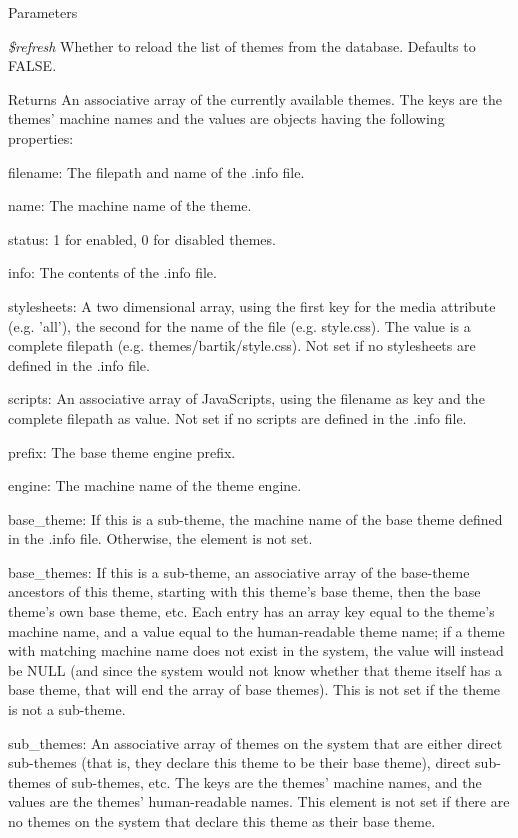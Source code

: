 \begin{DoxyParams}{Parameters}
\item[{\em \$refresh}]Whether to reload the list of themes from the database. Defaults to FALSE.\end{DoxyParams}
\begin{DoxyReturn}{Returns}
An associative array of the currently available themes. The keys are the themes' machine names and the values are objects having the following properties:
\begin{DoxyItemize}
\item filename: The filepath and name of the .info file.
\item name: The machine name of the theme.
\item status: 1 for enabled, 0 for disabled themes.
\item info: The contents of the .info file.
\item stylesheets: A two dimensional array, using the first key for the media attribute (e.g. 'all'), the second for the name of the file (e.g. style.css). The value is a complete filepath (e.g. themes/bartik/style.css). Not set if no stylesheets are defined in the .info file.
\item scripts: An associative array of JavaScripts, using the filename as key and the complete filepath as value. Not set if no scripts are defined in the .info file.
\item prefix: The base theme engine prefix.
\item engine: The machine name of the theme engine.
\item base\_\-theme: If this is a sub-\/theme, the machine name of the base theme defined in the .info file. Otherwise, the element is not set.
\item base\_\-themes: If this is a sub-\/theme, an associative array of the base-\/theme ancestors of this theme, starting with this theme's base theme, then the base theme's own base theme, etc. Each entry has an array key equal to the theme's machine name, and a value equal to the human-\/readable theme name; if a theme with matching machine name does not exist in the system, the value will instead be NULL (and since the system would not know whether that theme itself has a base theme, that will end the array of base themes). This is not set if the theme is not a sub-\/theme.
\item sub\_\-themes: An associative array of themes on the system that are either direct sub-\/themes (that is, they declare this theme to be their base theme), direct sub-\/themes of sub-\/themes, etc. The keys are the themes' machine names, and the values are the themes' human-\/readable names. This element is not set if there are no themes on the system that declare this theme as their base theme. 
\end{DoxyItemize}
\end{DoxyReturn}
